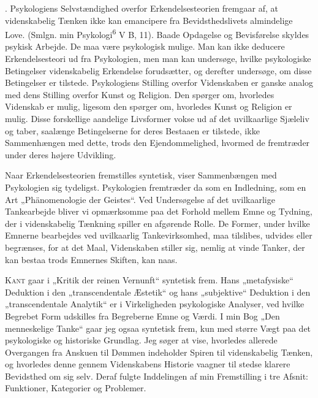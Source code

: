 \documentclass[12pt]{article}
\newcommand{\opage}[1]{\marginnote{\footnotesize\textit{[#1]}}}
\begin{document}
. Psykologiens Selvstændighed overfor Erkendelsesteorien fremgaar af, at
videnskabelig Tænken ikke kan emancipere fra Bevidsthedslivets almindelige
Love. (Smlgn. min Psykologi\textsuperscript{6} V B, 11). Baade Opdagelse og
Bevisførelse skyldes psykisk Arbejde. De maa være psykologisk mulige. Man kan
ikke deducere Erkendelsesteori ud fra Psykologien, men man kan undersøge, hvilke
psykologiske Betingelser videnskabelig Erkendelse forudsætter, og derefter
undersøge, om disse Betingelser er tilstede. Psykologiens Stilling overfor
Videnskaben er ganske analog med dens Stilling overfor Kunst og Religion. Den
spørger om, hvorledes Videnskab er mulig, ligesom den spørger om, hvorledes
Kunst og Religion er mulig. Disse forskellige aandelige Livsformer vokse ud af
det uvilkaarlige Sjæleliv og taber, saalænge Betingelserne for deres Bestaaen er
tilstede, ikke Sammenhængen med dette, trods den Ejendommelighed, hvormed de
fremtræder under deres højere Udvikling.

Naar Erkendelsesteorien fremstilles syntetisk, viser Sammenbængen med
Psykologien sig tydeligst. Psykologien fremtræder da som en Indledning, som en
Art „Phänomenologie der Geistes“. Ved Undersøgelse af det uvilkaarlige
Tankearbejde bliver vi opmærksomme paa det Forhold mellem Emne og Tydning, der i
videnskabelig Tænkning spiller en afgørende Rolle. De Former, under hvilke
Emnerne
\opage{14}bearbejdes ved uvilkaarlig Tankevirksomhed, maa tilslibes, udvides
eller begrænses, for at det Maal, Videnskaben stiller sig, nemlig at vinde
Tanker, der kan bestaa trods Emnernes Skiften, kan naas.

\textsc{Kant} gaar i „Kritik der reinen Vernunft“ syntetisk frem. Hans
„metafysiske“ Deduktion i den „transcendentale Æstetik“ og hans „subjektive“
Deduktion i den „transcendentale Analytik“ er i Virkeligheden psykologiske
Analyser, ved hvilke Begrebet Form udskilles fra Begreberne Emne og Værdi. I min
Bog „Den menneskelige Tanke“ gaar jeg ogsaa syntetisk frem, kun med større Vægt
paa det psykologiske og historiske Grundlag. Jeg søger at vise, hvorledes
allerede Overgangen fra Anskuen til Dømmen indeholder Spiren til videnskabelig
Tænken, og hvorledes denne gennem Videnskabens Historie vaagner til stedse
klarere Bevidsthed om sig selv. Deraf fulgte Inddelingen af min Fremstilling i
tre Afsnit: Funktioner, Kategorier og Problemer.
\end{document}
